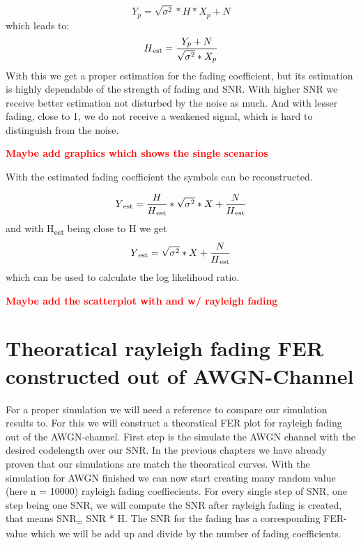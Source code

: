 \documentclass[12pt,oneside, reqno]{report}
\newcommand\boldred[1]{\textcolor{red}{\textbf{#1}}}
\begin{document}
\begin{equation}
\label{eq:fadest}
Y_p = \sqrt{\sigma^2}*H*X_p + N
\end{equation}
which leads to:
\begin{equation}
H\textsubscript{est} = \frac{Y_p + N}{\sqrt{\sigma^2} * X_p}
\end{equation}
With this we get a proper estimation for the fading coefficient, but its estimation is highly dependable of the strength of fading and SNR. With higher SNR we receive better estimation not disturbed by the noise as much. And with lesser fading, close to 1, we do not receive a weakened signal, which is hard to distinguish from the noise. 

\boldred{Maybe add graphics which shows the single scenarios}

With the estimated fading coefficient the symbols can be reconstructed.

\begin{equation}
Y\textsubscript{est} = \frac{H}{H\textsubscript{est}}*\sqrt{\sigma^2}*X + \frac{N}{H\textsubscript{est}}
\end{equation}
and with H\textsubscript{est} being close to H we get
\begin{equation}
Y\textsubscript{est} = \sqrt{\sigma^2}*X + \frac{N}{H\textsubscript{est}}
\end{equation}
which can be used to calculate the log likelihood ratio.

\boldred{Maybe add the scatterplot with and w/ rayleigh fading}

\section{Theoratical rayleigh fading FER constructed out of AWGN-Channel}

For a proper simulation we will need a reference to compare our simulation results to. For this we will construct a theoratical FER plot for rayleigh fading out of the AWGN-channel.
First step is the simulate the AWGN channel with the desired codelength over our SNR. In the previous chapters we have already proven that our simulations are match the theoratical curves. With the simulation for AWGN finished we can now start creating
many random value (here n = 10000) rayleigh fading coeffiecients. For every single step of SNR, one step being one SNR, we will compute the SNR after rayleigh fading is created, that means SNR\textsubscript = SNR * H. The SNR for the fading has a corresponding FER-value which we will be add up and divide by the number of fading coefficients.
\end{document}
